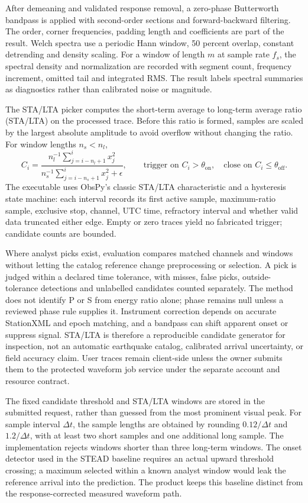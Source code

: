 After demeaning and validated response removal, a zero-phase Butterworth
bandpass is applied with second-order sections and forward-backward
filtering. The order, corner frequencies, padding length and coefficients
are part of the result. Welch spectra use a periodic Hann window, 50
percent overlap, constant detrending and density scaling. For a window of
length \(m\) at sample rate \(f_s\), the spectral density and
normalization are recorded with segment count, frequency increment,
omitted tail and integrated RMS. The result labels spectral summaries as
diagnostics rather than calibrated noise or magnitude.

The STA/LTA picker computes the short-term average to long-term
average ratio (STA/LTA) on the processed trace. Before this ratio is
formed, samples are scaled by the largest absolute amplitude to avoid
overflow without changing the ratio. For window lengths \(n_s<n_l\),
\begin{equation}\label{eq:stalta}
 C_i=\frac{n_l^{-1}\sum_{j=i-n_l+1}^{i}x_j^2}
 {n_s^{-1}\sum_{j=i-n_s+1}^{i}x_j^2+\epsilon},\qquad
 \text{trigger on } C_i>\theta_{\mathrm{on}},\quad
 \text{close on } C_i\leq\theta_{\mathrm{off}}.
\end{equation}
The executable uses ObsPy's classic STA/LTA characteristic and a
hysteresis state machine: each interval records its first active sample,
maximum-ratio sample, exclusive stop, channel, UTC time, refractory
interval and whether valid data truncated either edge. Empty or zero
traces yield no fabricated trigger; candidate counts are bounded.

Where analyst picks exist, evaluation compares matched channels and
windows without letting the catalog reference change preprocessing or
selection. A pick is judged within a declared time tolerance, with misses,
false picks, outside-tolerance detections and unlabelled candidates
counted separately. The method does not identify P or S from energy ratio
alone; phase remains null unless a reviewed phase rule supplies it.
Instrument correction depends on accurate StationXML and epoch matching,
and a bandpass can shift apparent onset or suppress signal. STA/LTA is
therefore a reproducible candidate generator for inspection, not an
automatic earthquake catalog, calibrated arrival uncertainty, or field
accuracy claim. User traces remain client-side unless the owner submits
them to the protected waveform job service under the separate account and
resource contract.

The fixed candidate threshold and STA/LTA windows are stored in the
submitted request, rather than guessed from the most prominent visual
peak. For sample interval \(\Delta t\), the sample lengths are obtained
by rounding \(0.12/\Delta t\) and \(1.2/\Delta t\), with at least two
short samples and one additional long sample. The implementation rejects
windows shorter than three long-term windows. The onset detector used in
the STEAD baseline requires an actual upward threshold crossing; a
maximum selected within a known analyst window would leak the reference
arrival into the prediction. The product keeps this baseline distinct
from the response-corrected measured waveform path.

